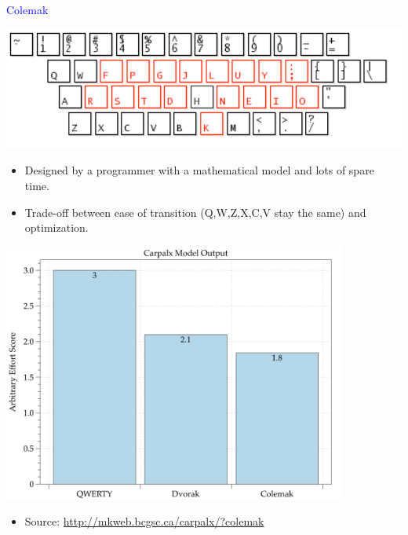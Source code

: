 \documentclass[landscape]{slides}
\begin{document}
\begin{slide}

    \textcolor{blue}{\Large{Colemak}}

    \centering
    \includegraphics[width=20cm]{colemak-annot}

    \begin{itemize}
        \item Designed by a programmer with a mathematical model and lots of spare time.
        \item Trade-off between ease of transition (Q,W,Z,X,C,V stay the same) and optimization.
    \end{itemize}

\end{slide}


\begin{slide}

    \centering

    \includegraphics[width=0.85\textwidth]{keyboards}

    \begin{itemize}
        \item Source: \url{http://mkweb.bcgsc.ca/carpalx/?colemak}
    \end{itemize}

\end{slide}
\end{document}
